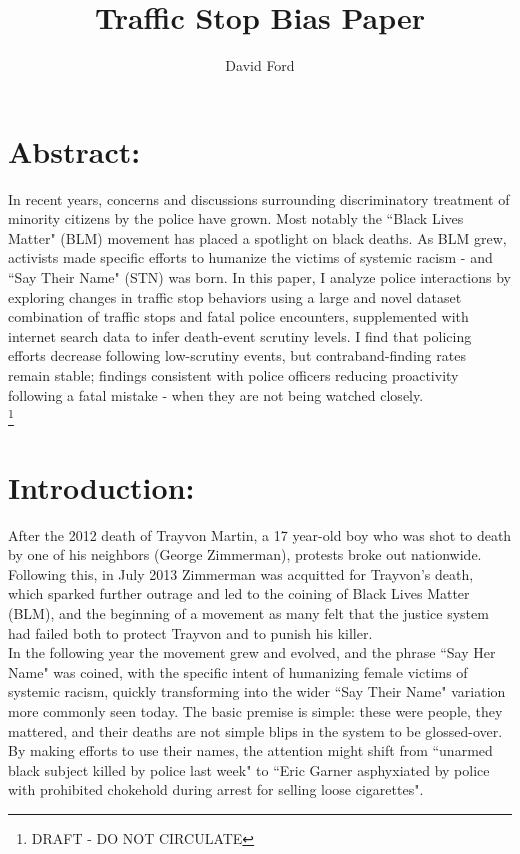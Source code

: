\documentclass[12pt,a4paper]{article}
\begin{document}
\title{Traffic Stop Bias Paper}
\author{David Ford}
\maketitle


\section{Abstract:}

In recent years, concerns and discussions surrounding discriminatory treatment of minority citizens by the police have grown. Most notably the ``Black Lives Matter" (BLM) movement has placed a spotlight on black deaths. As BLM grew, activists made specific efforts to humanize the victims of systemic racism - and ``Say Their Name" (STN) was born. In this paper, I analyze police interactions by exploring changes in traffic stop behaviors using a large and novel dataset combination of traffic stops and fatal police encounters, supplemented with internet search data to infer death-event scrutiny levels. I find that policing efforts decrease following low-scrutiny events, but contraband-finding rates remain stable; findings consistent with police officers reducing proactivity following a fatal mistake - when they are not being watched closely. \\

\footnote{DRAFT - DO NOT CIRCULATE} \\


\section{Introduction:} 

After the 2012 death of Trayvon Martin, a 17 year-old boy who was shot to death by one of his neighbors (George Zimmerman), protests broke out nationwide. Following this, in July 2013 Zimmerman was acquitted for Trayvon's death, which sparked further outrage and led to the coining of Black Lives Matter (BLM), and the beginning of a movement as many felt that the justice system had failed both to protect Trayvon and to punish his killer. \\

In the following year the movement grew and evolved, and the phrase ``Say Her Name" was coined, with the specific intent of humanizing female victims of systemic racism, quickly transforming into the wider ``Say Their Name" variation more commonly seen today. The basic premise is simple: these were people, they mattered, and their deaths are not simple blips in the system to be glossed-over. By making efforts to use their names, the attention might shift from ``unarmed black subject killed by police last week" to ``Eric Garner asphyxiated by police with prohibited chokehold during arrest for selling loose cigarettes". \\ 
\end{document}
